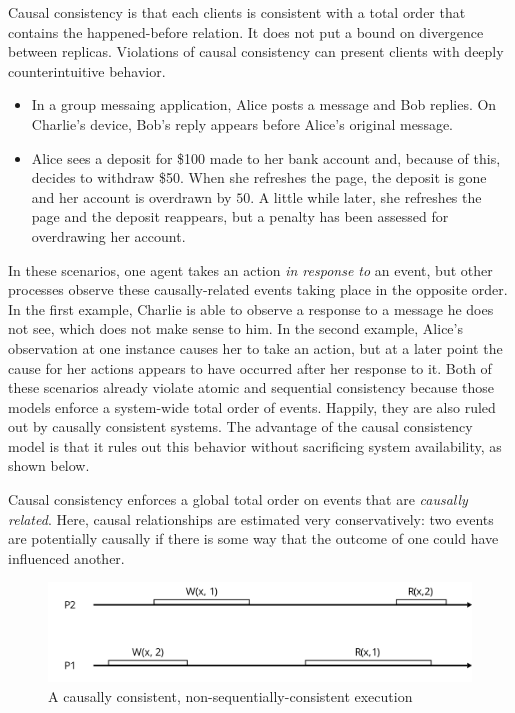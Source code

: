 \documentclass[]             %
{NASA}                       %
\theoremstyle{definition}
\providecommand{\tightlist}{%
  \setlength{\itemsep}{0pt}\setlength{\parskip}{0pt}}
\begin{document}
Causal consistency is that each clients is consistent with a total order
that contains the happened-before relation. It does not put a bound on
divergence between replicas. Violations of causal consistency can
present clients with deeply counterintuitive behavior.

\begin{itemize}
\tightlist
\item
  In a group messaing application, Alice posts a message and Bob
  replies. On Charlie's device, Bob's reply appears before Alice's
  original message.
\item
  Alice sees a deposit for \$100 made to her bank account and, because
  of this, decides to withdraw \$50. When she refreshes the page, the
  deposit is gone and her account is overdrawn by \(50\). A little while
  later, she refreshes the page and the deposit reappears, but a penalty
  has been assessed for overdrawing her account.
\end{itemize}

In these scenarios, one agent takes an action \emph{in response to} an
event, but other processes observe these causally-related events taking
place in the opposite order. In the first example, Charlie is able to
observe a response to a message he does not see, which does not make
sense to him. In the second example, Alice's observation at one instance
causes her to take an action, but at a later point the cause for her
actions appears to have occurred after her response to it. Both of these
scenarios already violate atomic and sequential consistency because
those models enforce a system-wide total order of events. Happily, they
are also ruled out by causally consistent systems. The advantage of the
causal consistency model is that it rules out this behavior without
sacrificing system availability, as shown below.

Causal consistency enforces a global total order on events that are
\emph{causally related}. Here, causal relationships are estimated very
conservatively: two events are potentially causally if there is some way
that the outcome of one could have influenced another.

\begin{figure}
  \center
  \includegraphics[scale=0.4]{images/causal1.png}
  \caption{A causally consistent, non-sequentially-consistent execution}
\end{figure}
\end{document}
